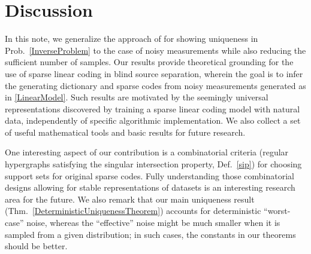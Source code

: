 \documentclass[9pt,twocolumn]{pnas-new}
\begin{document}
\section{Discussion}\label{Discussion}


In this note, we generalize the approach of \cite{Hillar15} for showing uniqueness in Prob.~\ref{InverseProblem} to the case of noisy measurements while also reducing the sufficient number of samples.
Our results provide theoretical grounding for the use of sparse linear coding in blind source separation, wherein the goal is to infer the generating dictionary and sparse codes from noisy measurements generated as in \eqref{LinearModel}.  Such results are motivated by the seemingly universal representations discovered by training a sparse linear coding model with natural data, independently of specific algorithmic implementation.  We also collect a set of useful mathematical tools and basic results for future research.  %

One interesting aspect of our contribution is a combinatorial criteria (regular hypergraphs satisfying the singular intersection property, Def.~\ref{sip}) for choosing support sets for original sparse codes. Fully understanding those combinatorial designs allowing for stable representations of datasets is an interesting research area for the future.
We also remark that our main uniqueness result (Thm.~\ref{DeterministicUniquenessTheorem}) accounts for deterministic ``worst-case'' noise, whereas the ``effective'' noise might be much smaller when it is sampled from a given distribution; in such cases, the constants in our theorems %
should be better. %
\end{document}
